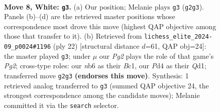\documentclass[11pt]{article}
\begin{document}
\begin{figure}[p]\centering
\begin{subfigure}{0.46\textwidth}\centering
\resizebox{\linewidth}{!}{%
\newchessgame
\chessboard[
  setfen={r1bqkb1r/pp2pppp/1nnp4/4P3/3P4/5N2/PP2KPPP/RNBQ1B1R w kq - 2 8},
  showmover=false,
  pgfstyle=straightmove, color=movearrow, markmove={g2-g3}
]}
\caption{}
\end{subfigure}\hfill
\begin{subfigure}{0.46\textwidth}\centering
\resizebox{\linewidth}{!}{%
\newchessgame
\chessboard[
  setfen={r1bqrbk1/ppp2ppp/3p1nn1/8/P2NP3/2N4P/1PP2PP1/R1BQRBK1 w - - 1 12},
  showmover=false,
  pgfstyle=straightmove, color=movearrow, markmove={g2-g3}
]}
\caption{}
\end{subfigure}
\\[4pt]

\caption{\textbf{Move 8, White: \texttt{g3}.} (a) Our position; Melanie plays \texttt{g3} (\texttt{g2g3}). Panels (b)--(d) are the retrieved master positions whose correspondence most drove this move (highest QAP objective among those that transfer to it). (b) Retrieved from \texttt{lichess\_elite\_2024-09\_p0024\#1196} (ply 22) [structural distance $d$=61, QAP obj=24]: the master played \texttt{g3}; under $\mu$ our \emph{Pg2} plays the role of that game's \emph{Pg2}; cross-type roles: our \emph{n}b6 as their \emph{B}c1, our \emph{P}d4 as their \emph{Q}d1; transferred move \texttt{g2g3} \textbf{(endorses this move)}. Synthesis: 1 retrieved analog transferred to \texttt{g3} (summed QAP objective 24, the strongest correspondence among the candidate moves); Melanie committed it via the \texttt{search} selector.}
\label{fig:thought-m14}
\end{figure}

\clearpage
\end{document}
